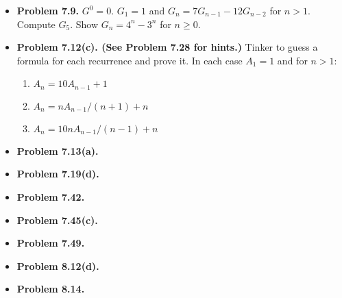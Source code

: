 \documentclass{article}
\begin{document}
    \begin{itemize}
        \item \textbf{Problem 7.9.} $G^0 = 0$. $G_1 = 1$ and $G_n = 7G_{n-1} - 12 G_{n-2}$ for $n > 1$. Compute $G_5$. Show $G_n = 4^n - 3^n$ for $n \geq 0$.
        \item \textbf{Problem 7.12(c). (See Problem 7.28 for hints.)} Tinker to guess a formula for each recurrence and prove it. In each case $A_1 = 1$ and for $n > 1$:
        \begin{enumerate}[label=(\alph*)]
            \item $A_n = 10A_{n-1} + 1$
            \item $A_n = nA_{n-1} / (n+1) + n$
            \item $A_n = 10nA_{n-1} / (n-1) + n$
        \end{enumerate}
        \item \textbf{Problem 7.13(a).}
        \item \textbf{Problem 7.19(d).}
        \item \textbf{Problem 7.42.}
        \item \textbf{Problem 7.45(c).}
        \item \textbf{Problem 7.49.}
        \item \textbf{Problem 8.12(d).}
        \item \textbf{Problem 8.14.}
    \end{itemize}
    
\end{document}
